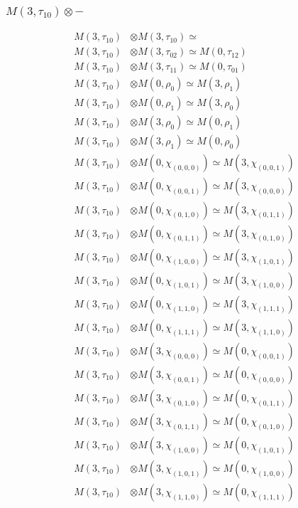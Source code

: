 \subsubsection{$ M(3,\tau_{10})\otimes -$}
\begin{align*}
M(3,\tau_{10}) &\otimes M(3,\tau_{10}) \simeq  \\
M(3,\tau_{10}) &\otimes M(3,\tau_{02}) \simeq M(0,\tau_{12}) \\
M(3,\tau_{10}) &\otimes M(3,\tau_{11}) \simeq M(0,\tau_{01}) \\
M(3,\tau_{10}) &\otimes M(0,\rho_{0}) \simeq M(3,\rho_{1}) \\
M(3,\tau_{10}) &\otimes M(0,\rho_{1}) \simeq M(3,\rho_{0}) \\
M(3,\tau_{10}) &\otimes M(3,\rho_{0}) \simeq M(0,\rho_{1}) \\
M(3,\tau_{10}) &\otimes M(3,\rho_{1}) \simeq M(0,\rho_{0}) \\
M(3,\tau_{10}) &\otimes M(0,\chi_{(0,0,0)}) \simeq M(3,\chi_{(0,0,1)}) \\
M(3,\tau_{10}) &\otimes M(0,\chi_{(0,0,1)}) \simeq M(3,\chi_{(0,0,0)}) \\
M(3,\tau_{10}) &\otimes M(0,\chi_{(0,1,0)}) \simeq M(3,\chi_{(0,1,1)}) \\
M(3,\tau_{10}) &\otimes M(0,\chi_{(0,1,1)}) \simeq M(3,\chi_{(0,1,0)}) \\
M(3,\tau_{10}) &\otimes M(0,\chi_{(1,0,0)}) \simeq M(3,\chi_{(1,0,1)}) \\
M(3,\tau_{10}) &\otimes M(0,\chi_{(1,0,1)}) \simeq M(3,\chi_{(1,0,0)}) \\
M(3,\tau_{10}) &\otimes M(0,\chi_{(1,1,0)}) \simeq M(3,\chi_{(1,1,1)}) \\
M(3,\tau_{10}) &\otimes M(0,\chi_{(1,1,1)}) \simeq M(3,\chi_{(1,1,0)}) \\
M(3,\tau_{10}) &\otimes M(3,\chi_{(0,0,0)}) \simeq M(0,\chi_{(0,0,1)}) \\
M(3,\tau_{10}) &\otimes M(3,\chi_{(0,0,1)}) \simeq M(0,\chi_{(0,0,0)}) \\
M(3,\tau_{10}) &\otimes M(3,\chi_{(0,1,0)}) \simeq M(0,\chi_{(0,1,1)}) \\
M(3,\tau_{10}) &\otimes M(3,\chi_{(0,1,1)}) \simeq M(0,\chi_{(0,1,0)}) \\
M(3,\tau_{10}) &\otimes M(3,\chi_{(1,0,0)}) \simeq M(0,\chi_{(1,0,1)}) \\
M(3,\tau_{10}) &\otimes M(3,\chi_{(1,0,1)}) \simeq M(0,\chi_{(1,0,0)}) \\
M(3,\tau_{10}) &\otimes M(3,\chi_{(1,1,0)}) \simeq M(0,\chi_{(1,1,1)}) \\

\end{align*}
